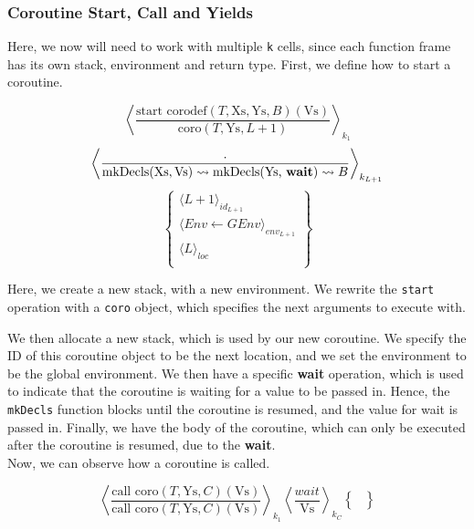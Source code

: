 \documentclass[review,twocolumn]{sigplanconf}
\begin{document}
\subsubsection*{Coroutine Start, Call and Yields}

Here, we now will need to work with multiple \verb!k! cells, since each function frame has its own stack, environment and return type. First, we define how to start a coroutine.

\begin{small}
  \[
    \left\langle
    \frac{ \text{start corodef}(T, \text{Xs}, \text{Ys}, B)(\text{Vs}) }{ \text{coro}(T, \text{Ys}, L + 1) }
    \right\rangle _{k_1}
  \]
  \[
    \left\langle
    \frac{ . }{ \text{mkDecls}(\text{Xs}, \text{Vs})\leadsto \text{mkDecls(Ys, \textbf{wait})} \leadsto {B} }
    \right\rangle _{k_{L + 1}}
  \]
  \[
    \left\{
    \begin{array}{l}
      \langle L + 1 \rangle_{id_{L+1}}               \\
      \langle Env \leftarrow GEnv\rangle_{env_{L+1}} \\
      \langle L \rangle_{loc}                        \\
    \end{array}
    \right\}
  \]
\end{small}

Here, we create a new stack, with a new environment. We rewrite the \verb!start! operation with a \verb!coro! object, which specifies the next arguments to execute with.

We then allocate a new stack, which is used by our new coroutine. We specify the ID of this coroutine object to be the next location, and we set the environment to be the global environment.
We then have a specific \textbf{wait} operation, which is used to indicate that the coroutine is waiting for a value to be passed in. Hence, the \verb!mkDecls! function blocks until the coroutine is resumed, and the value for wait is passed in. Finally, we have the body of the coroutine, which can only be executed after the coroutine is resumed, due to the \textbf{wait}. \\

Now, we can observe how a coroutine is called.

\begin{small}
  \[
    \left\langle
    \frac{ \text{call coro}(T, \text{Ys}, C)(\text{Vs}) }{ \text{call coro}(T, \text{Ys}, C)(\text{Vs}) }
    \right\rangle _{k_1}
    \left\langle
    \frac{ wait }{ \text{Vs} }
    \right\rangle _{k_{C}}
    \left\{
    \begin{array}{l}
      \\
      \\
    \end{array}
    \right\}
  \]
\end{small}
\end{document}
